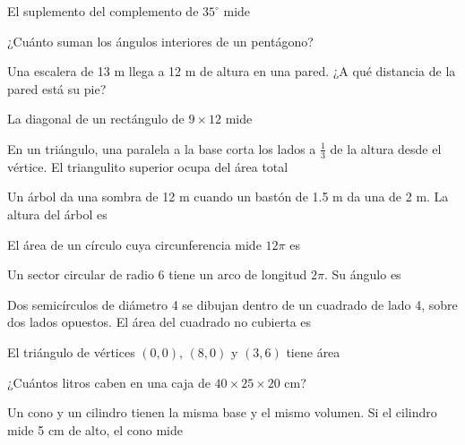 \bitacora

\evaluacion
\begin{ejercicios}
\item El suplemento del complemento de $35^\circ$ mide
\item ¿Cuánto suman los ángulos interiores de un pentágono?
\item Una escalera de 13 m llega a 12 m de altura en una pared. ¿A qué distancia de la pared está su pie?
\item La diagonal de un rectángulo de $9 \times 12$ mide
\item En un triángulo, una paralela a la base corta los lados a $\tfrac13$ de la altura desde el vértice. El triangulito superior ocupa del área total
\item Un árbol da una sombra de 12 m cuando un bastón de 1.5 m da una de 2 m. La altura del árbol es
\item El área de un círculo cuya circunferencia mide $12\pi$ es
\opciones{$36\pi$}{$144\pi$}{$12\pi$}{$6\pi$}
\item Un sector circular de radio 6 tiene un arco de longitud $2\pi$. Su ángulo es
\item Dos semicírculos de diámetro 4 se dibujan dentro de un cuadrado de lado 4, sobre dos lados opuestos. El área del cuadrado no cubierta es
\item El triángulo de vértices $(0, 0)$, $(8, 0)$ y $(3, 6)$ tiene área
\item ¿Cuántos litros caben en una caja de $40 \times 25 \times 20$ cm?
\item Un cono y un cilindro tienen la misma base y el mismo volumen. Si el cilindro mide 5 cm de alto, el cono mide
\end{ejercicios}
